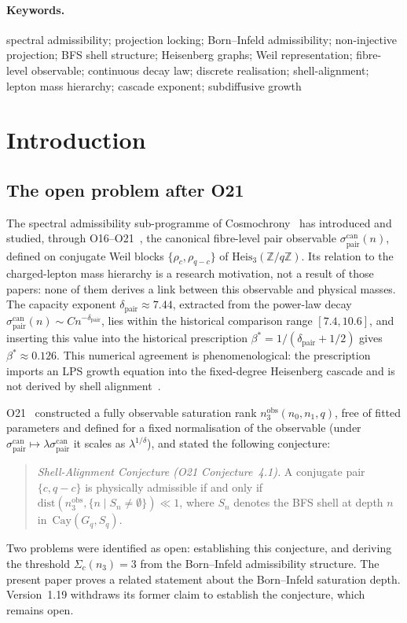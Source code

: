 \documentclass[12pt,a4paper]{article}
\theoremstyle{remark}
\newcommand{\sigpair}{\sigma^{\mathrm{can}}_{\mathrm{pair}}}
\newcommand{\nobs}{n^{\mathrm{obs}}_3}
\newcommand{\dpair}{\delta_{\mathrm{pair}}}
\newcommand{\bstar}{\beta^*}
\newcommand{\Cay}{\mathrm{Cay}(G_q, S_q)}
\newcommand{\Heis}{\mathrm{Heis}_3(\mathbb{Z}/q\mathbb{Z})}
\begin{document}
  \paragraph{Keywords.}
    spectral admissibility; projection locking; Born--Infeld admissibility; non-injective projection;
    BFS shell structure; Heisenberg graphs; Weil representation; fibre-level observable;
    continuous decay law; discrete realisation; shell-alignment; lepton mass hierarchy;
    cascade exponent; subdiffusive growth

    \tableofcontents

    \clearpage
  \section{Introduction}
  \label{sec:intro}

  \subsection{The open problem after O21}
    \label{subsec:open_after_o21}

    The spectral admissibility sub-programme of Cosmochrony~\cite{Cosmochrony} has introduced and
    studied, through O16--O21~\cite{Beau2026a20,Beau2026a21,Beau2026a22,Beau2026a23,Beau2026a24,Beau2026a25},
    the canonical fibre-level pair observable $\sigpair(n)$, defined on conjugate Weil blocks
    $\{\rho_c, \rho_{q-c}\}$ of $\Heis$.
    Its relation to the charged-lepton mass hierarchy is a research motivation, not a result of
    those papers: none of them derives a link between this observable and physical masses.
    The capacity exponent $\dpair \approx 7.44$, extracted from the power-law decay
    $\sigpair(n) \sim C n^{-\dpair}$, lies within the historical comparison range $[7.4, 10.6]$, and
    inserting this value into the historical prescription
    $\bstar = 1/(\dpair + 1/2)$ gives $\bstar \approx 0.126$.
    This numerical agreement is phenomenological: the prescription imports an LPS growth
    equation into the fixed-degree Heisenberg cascade and is not derived by shell
    alignment~\cite{Beau2026sgn}.

    O21~\cite{Beau2026a25} constructed a fully observable saturation rank
    $\nobs(n_0, n_1, q)$, free of fitted parameters and defined for a fixed normalisation
    of the observable (under $\sigpair \mapsto \lambda\sigpair$ it scales as
    $\lambda^{1/\delta}$), and stated the
    following conjecture:
    \begin{quote}
      \emph{Shell-Alignment Conjecture (O21 Conjecture~4.1).}
      A conjugate pair $\{c, q-c\}$ is physically admissible if and only if
      $\mathrm{dist}(\nobs, \{n \mid S_n \neq \emptyset\}) \ll 1$,
      where $S_n$ denotes the BFS shell at depth $n$ in~$\Cay$.
    \end{quote}
    Two problems were identified as open: establishing this conjecture, and deriving the
    threshold $\Sigma_c(n_3) = 3$ from the Born--Infeld admissibility structure.
    The present paper proves a related statement about the Born--Infeld saturation depth.
    Version~1.19 withdraws its former claim to establish the conjecture, which remains open.
\end{document}
